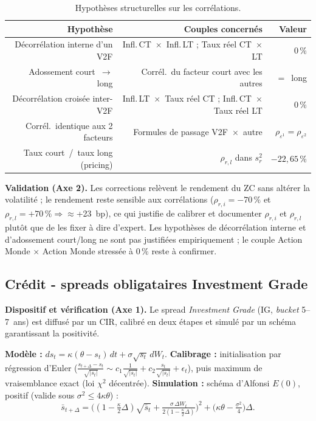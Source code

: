 \documentclass[11pt,a4paper]{article}
\renewcommand{\arraystretch}{1.4}
\newcommand{\tablehead}[1]{\textcolor{nxnavy}{\sffamily\bfseries\small #1}}
\begin{document}
\begin{table}[H]
\centering\small
\renewcommand{\arraystretch}{1.4}\setlength{\tabcolsep}{5pt}
\begin{tabularx}{\linewidth}{R R R}
\toprule
\tablehead{Hypothèse} & \tablehead{Couples concernés} & \tablehead{Valeur} \\
\midrule
{} Décorrélation interne d'un V2F & Infl.\,CT~$\times$~Infl.\,LT ; Taux réel CT~$\times$~LT & $0\,\%$ \\
Adossement court~$\to$~long & Corrél.\ du facteur court avec les autres & $=$~long \\
 Décorrélation croisée inter-V2F & Infl.\,LT~$\times$~Taux réel CT ; Infl.\,CT~$\times$~Taux réel LT & $0\,\%$ \\
Corrél.\ identique aux 2 facteurs & Formules de passage V2F~$\times$~autre & $\rho_{\varepsilon^1}=\rho_{\varepsilon^2}$ \\
 Taux court~/~taux long (pricing) & $\rho_{r,l}$ dans $s_r^2$ & $-22{,}65\,\%$ \\
\bottomrule
\end{tabularx}
\caption{Hypothèses structurelles sur les corrélations.}
\end{table}

\textbf{Validation (Axe 2).} Les corrections relèvent le rendement du ZC sans altérer la volatilité ; le rendement reste sensible aux corrélations ($\rho_{r,i}=-70\,\%$ et $\rho_{r,l}=+70\,\%\Rightarrow\approx$+23~bp), ce qui justifie de calibrer et documenter $\rho_{r,i}$ et $\rho_{r,l}$ plutôt que de les fixer à dire d'expert. Les hypothèses de décorrélation interne et d'adossement court/long ne sont pas justifiées empiriquement ; le couple Action Monde $\times$ Action Monde stressée à $0\,\%$ reste à confirmer.

\subsection{Crédit - spreads obligataires Investment Grade}

\textbf{Dispositif et vérification (Axe 1).} Le spread \emph{Investment Grade} (IG, \emph{bucket} 5--7~ans) est diffusé par un CIR, calibré en deux étapes et simulé par un schéma garantissant la positivité.
\begin{definitionbox}
\textbf{Modèle :} $ds_t=\kappa(\theta-s_t)\,dt+\sigma\sqrt{s_t}\,dW_t$. \textbf{Calibrage :} initialisation par régression d'Euler ($\tfrac{s_{t+\Delta}-s_t}{\sqrt{|s_t|}}\sim c_1\tfrac{1}{\sqrt{|s_t|}}+c_2\tfrac{s_t}{\sqrt{|s_t|}}+\epsilon_t$), puis maximum de vraisemblance exact (loi $\chi^2$ décentrée). \textbf{Simulation :} schéma d'Alfonsi $E(0)$, positif (valide sous $\sigma^2\le4\kappa\theta$) :
\[
\bar s_{t+\Delta}=\Big((1-\tfrac{\kappa}{2}\Delta)\sqrt{\bar s_t}+\tfrac{\sigma\,\Delta W_t}{2(1-\tfrac{\kappa}{2}\Delta)}\Big)^{\!2}+\Big(\kappa\theta-\tfrac{\sigma^2}{4}\Big)\Delta .
\]
\end{definitionbox}
\end{document}
